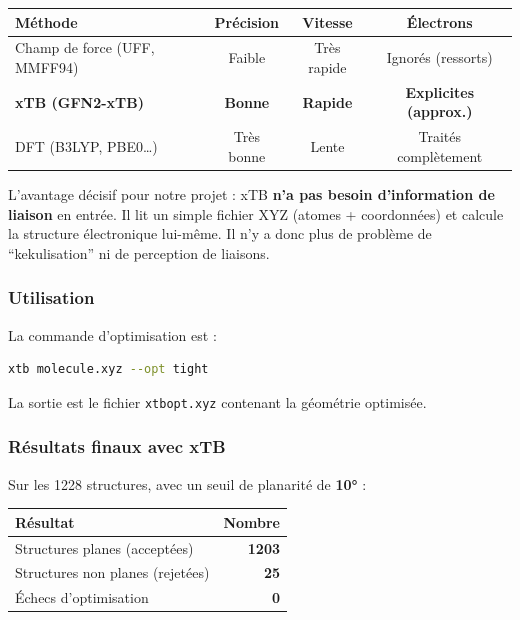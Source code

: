 \documentclass[a4paper,12pt]{article}
\begin{document}
\begin{center}
\begin{tabular}{lccc}
  \toprule
  Méthode & Précision & Vitesse & Électrons \\
  \midrule
  Champ de force (UFF, MMFF94) & Faible & Très rapide & Ignorés (ressorts) \\
  \textbf{xTB (GFN2-xTB)} & \textbf{Bonne} & \textbf{Rapide} & \textbf{Explicites (approx.)} \\
  DFT (B3LYP, PBE0\ldots) & Très bonne & Lente & Traités complètement \\
  \bottomrule
\end{tabular}
\end{center}

L'avantage décisif pour notre projet : xTB \textbf{n'a pas besoin d'information de liaison}
en entrée. Il lit un simple fichier XYZ (atomes + coordonnées) et calcule la structure
électronique lui-même. Il n'y a donc plus de problème de ``kekulisation'' ni de perception de
liaisons.

\subsubsection{Utilisation}

La commande d'optimisation est :
\begin{lstlisting}[language=bash, style={}]
xtb molecule.xyz --opt tight
\end{lstlisting}
La sortie est le fichier \texttt{xtbopt.xyz} contenant la géométrie optimisée.

\subsubsection{Résultats finaux avec xTB}

Sur les 1228 structures, avec un seuil de planarité de \textbf{10°} :

\begin{center}
\begin{tabular}{lr}
  \toprule
  Résultat & Nombre \\
  \midrule
  Structures planes (acceptées) & \textbf{1203} \\
  Structures non planes (rejetées) & \textbf{25} \\
  Échecs d'optimisation & \textbf{0} \\
  \bottomrule
\end{tabular}
\end{center}
\end{document}
